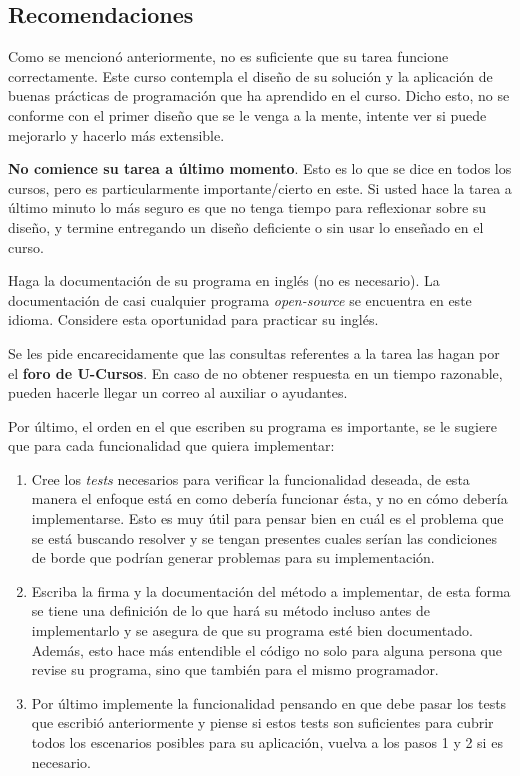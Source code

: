   \subsection{Recomendaciones}
    Como se mencionó anteriormente, no es suficiente que su tarea funcione correctamente. 
    Este curso contempla el diseño de su solución y la aplicación de buenas prácticas 
    de programación que ha aprendido en el curso. 
    Dicho esto, no se conforme con el primer diseño que se le venga a la mente, intente 
    ver si puede mejorarlo y hacerlo más extensible.

    \textbf{No comience su tarea a último momento}. 
    Esto es lo que se dice en todos los cursos, pero es particularmente importante/cierto 
    en este. 
    Si usted hace la tarea a último minuto lo más seguro es que no tenga tiempo para 
    reflexionar sobre su diseño, y termine entregando un diseño deficiente o sin usar 
    lo enseñado en el curso.
    
    Haga la documentación de su programa en inglés (no es necesario). 
    La documentación de casi cualquier programa \textit{open-source} se encuentra en este 
    idioma. 
    Considere esta oportunidad para practicar su inglés.
    
    Se les pide encarecidamente que las consultas referentes a la tarea las hagan por 
    el \textbf{foro de U-Cursos}. 
    En caso de no obtener respuesta en un tiempo razonable, pueden hacerle llegar 
    un correo al auxiliar o ayudantes.

    Por último, el orden en el que escriben su programa es importante, se le sugiere que 
    para cada funcionalidad que quiera implementar:
    \begin{enumerate}
      \item Cree los \textit{tests} necesarios para verificar la funcionalidad deseada, de
        esta manera el enfoque está en como debería funcionar ésta, y no en cómo debería
        implementarse.
        Esto es muy útil para pensar bien en cuál es el problema que se está buscando 
        resolver y se tengan presentes cuales serían las condiciones de borde que podrían 
        generar problemas para su implementación.
      \item Escriba la firma y la documentación del método a implementar, de esta forma se
        tiene una definición de lo que hará su método incluso antes de implementarlo y se 
        asegura de que su programa esté bien documentado.
        Además, esto hace más entendible el código no solo para alguna persona que revise 
        su programa, sino que también para el mismo programador\footnotemark.
      \item Por último implemente la funcionalidad pensando en que debe pasar los tests que
        escribió anteriormente y piense si estos tests son suficientes para cubrir todos 
        los escenarios posibles para su aplicación, vuelva a los pasos 1 y 2 si es 
        necesario.
    \end{enumerate}
%